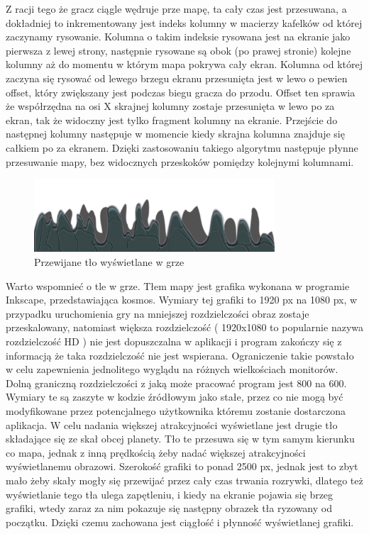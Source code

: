 Z racji tego że gracz ciągle wędruje prze mapę, ta cały czas jest przesuwana, a dokładniej  to inkrementowany jest indeks kolumny w macierzy kafelków od której zaczynamy rysowanie. Kolumna o takim indeksie rysowana jest na ekranie jako pierwsza z lewej strony, następnie rysowane są obok (po prawej stronie) kolejne kolumny aż do momentu w którym mapa pokrywa cały ekran.
Kolumna od której zaczyna się rysować od lewego brzegu ekranu przesunięta jest w lewo o pewien offset, który zwiększany jest podczas biegu gracza do przodu. Offset ten sprawia że współrzędna na osi X skrajnej kolumny zostaje przesunięta w lewo po za ekran, tak że widoczny jest tylko fragment kolumny na ekranie. Przejście do następnej kolumny następuje w momencie kiedy skrajna kolumna znajduje się całkiem po za ekranem. Dzięki zastosowaniu takiego algorytmu następuje płynne przesuwanie mapy, bez widocznych przeskoków pomiędzy kolejnymi kolumnami.

\begin{figure}[h]
    \centering
    \includegraphics[width=0.8\textwidth,natwidth=800,natheight=160]{./Pictures/back.png}
    \caption{Przewijane tło wyświetlane w grze}
\end{figure}

Warto wspomnieć o tle w grze. Tłem mapy jest grafika wykonana w programie Inkscape, przedstawiająca kosmos. Wymiary tej grafiki to 1920 px na 1080 px, w przypadku uruchomienia gry na mniejszej rozdzielczości obraz zostaje przeskalowany, natomiast większa rozdzielczość ( 1920x1080 to popularnie nazywa rozdzielczość HD ) nie jest dopuszczalna w aplikacji i program zakończy się z informacją że taka rozdzielczość nie jest wspierana. Ograniczenie takie powstało w celu zapewnienia jednolitego wyglądu na różnych wielkościach monitorów. Dolną graniczną rozdzielczości z jaką może pracować program jest 800 na 600. Wymiary te są zaszyte w kodzie źródłowym jako stałe, przez co nie mogą być modyfikowane przez potencjalnego użytkownika któremu zostanie dostarczona aplikacja. W celu nadania większej atrakcyjności wyświetlane jest drugie tło składające się ze skał obcej planety. 
Tło te przesuwa się w tym samym kierunku co mapa, jednak z inną prędkością żeby nadać
większej atrakcyjności wyświetlanemu obrazowi. Szerokość grafiki to ponad 2500 px, jednak jest to zbyt mało żeby skały mogły się przewijać przez cały czas trwania rozrywki, dlatego też wyświetlanie tego tła ulega zapętleniu, i kiedy na ekranie pojawia się brzeg grafiki, wtedy zaraz za nim pokazuje się następny obrazek tła ryzowany od początku. Dzięki czemu zachowana jest ciągłość i płynność wyświetlanej grafiki. 
 

